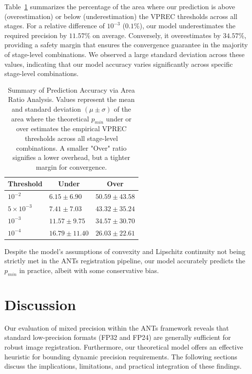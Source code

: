 \documentclass[journal,twoside,web]{ieeecolor}
\begin{document}
Table~\ref{tab:area-ratio-summary} summarizes the percentage of the area where our prediction is above (overestimation) or below (underestimation) the VPREC thresholds across all stages. For a relative difference of $10^{-3}$ ($0.1\%$), our model underestimates the required precision by $11.57\%$ on average. Conversely, it overestimates by $34.57\%$, providing a safety margin that ensures the convergence guarantee in the majority of stage-level combinations. We observed a large standard deviation across these values, indicating that our model accuracy varies significantly across specific stage-level combinations.
\begin{table}[htb!]
	\centering
	\begin{tabular}{@{}lll@{}}
		\toprule
		\multicolumn{1}{c}{\textbf{Threshold}} & \multicolumn{1}{c}{\textbf{Under}} & \multicolumn{1}{c}{\textbf{Over}} \\ \midrule
		$10^{-2}$                              & $6.15\pm6.90$                      & $50.59\pm43.58$                   \\
		$5\times10^{-3}$                       & $7.41\pm7.03$                      & $43.32\pm35.24$                   \\
		$10^{-3}$                              & $11.57\pm9.75$                     & $34.57\pm30.70$                   \\
		$10^{-4}$                              & $16.79\pm11.40$                    & $26.03\pm22.61$                   \\ \bottomrule
	\end{tabular}
	\caption{Summary of Prediction Accuracy via Area Ratio Analysis. Values represent the mean and standard deviation $(\mu \pm \sigma)$ of the area where the theoretical $p_{min}$ under or over estimates the empirical VPREC thresholds across all stage-level combinations. A smaller "Over" ratio signifies a lower overhead, but a tighter margin for convergence.}
	\label{tab:area-ratio-summary}
\end{table}

Despite the model's assumptions of convexity and Lipschitz continuity not being strictly met in the ANTs registration pipeline, our model accurately predicts the $p_{min}$ in practice, albeit with some conservative bias.

\section{Discussion}
\label{sec:discussion}
Our evaluation of mixed precision within the ANTs framework reveals that standard low-precision formats (FP32 and FP24) are generally sufficient for robust image registration. Furthermore, our theoretical model offers an effective heuristic for bounding dynamic precision requirements. The following sections discuss the implications, limitations, and practical integration of these findings.
\end{document}
